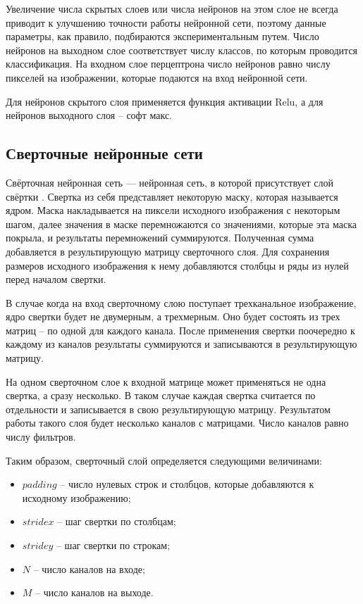 Увеличение числа скрытых слоев или числа нейронов на этом слое не всегда приводит к улучшению точности работы нейронной сети, поэтому данные параметры, как правило, подбираются экспериментальным путем. Число нейронов на выходном слое соответствует числу классов, по которым проводится классификация. На входном слое перцептрона число нейронов равно числу пикселей на изображении, которые подаются на вход нейронной сети.

Для нейронов скрытого слоя применяется функция активации Relu, а для нейронов выходного слоя -- софт макс.

\subsection{Сверточные нейронные сети}
Свёрточная нейронная сеть — нейронная сеть, в которой присутствует слой свёртки \cite{svertka}. Свертка из себя представляет некоторую маску, которая называется ядром. Маска накладывается на пиксели исходного изображения с некоторым шагом, далее значения в маске перемножаются со значениями, которые эта маска покрыла, и результаты перемножений суммируются. Полученная сумма добавляется в результирующую матрицу сверточного слоя. Для сохранения размеров исходного изображения к нему добавляются столбцы и ряды из нулей перед началом свертки.

В случае когда на вход сверточному слою поступает трехканальное изображение, ядро свертки будет не двумерным, а трехмерным. Оно будет состоять из трех матриц -- по одной для каждого канала. После применения свертки поочередно к каждому из каналов результаты суммируются и записываются в результирующую матрицу.

На одном сверточном слое к входной матрице может применяться не одна свертка, а сразу несколько. В таком случае каждая свертка считается по отдельности и записывается в свою результирующую матрицу. Результатом работы такого слоя будет несколько каналов с матрицами. Число каналов равно числу фильтров.

Таким образом, сверточный слой определяется следующими величинами:
\begin{itemize}
	\item $padding$ -- число нулевых строк и столбцов, которые добавляются к исходному изображению;
	\item $stridex$ -- шаг свертки по столбцам;
	\item $stridey$ -- шаг свертки по строкам;
	\item $N$ -- число каналов на входе;
	\item $M$ -- число каналов на выходе.
\end{itemize}

